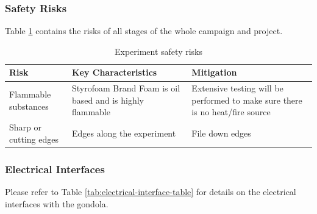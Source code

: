 \documentclass[a4paper,12pt,twoside]{article}
\begin{document}
\subsubsection{Safety Risks}
Table \ref{tab:safrisk} contains the risks of all stages of the whole campaign and project.
\begin{table}[H]
\centering

\begin{tabular}{|m{}|m{}|m{}|}
\hline
\textbf{Risk}          & \textbf{Key Characteristics}                              & \textbf{Mitigation}                                                           \\ \hline
Flammable substances    & Styrofoam Brand Foam is oil based and is highly flammable & Extensive testing will be performed to make sure there is no heat/fire source \\ \hline
Sharp or cutting edges & Edges along the experiment                                & File down edges                                                               \\ \hline
\end{tabular}
\caption{Experiment safety risks}
\label{tab:safrisk}
\end{table}
\raggedbottom

\pagebreak
\subsubsection{Electrical Interfaces}

Please refer to Table \ref{tab:electrical-interface-table} for details on the electrical interfaces with the gondola.
\end{document}
